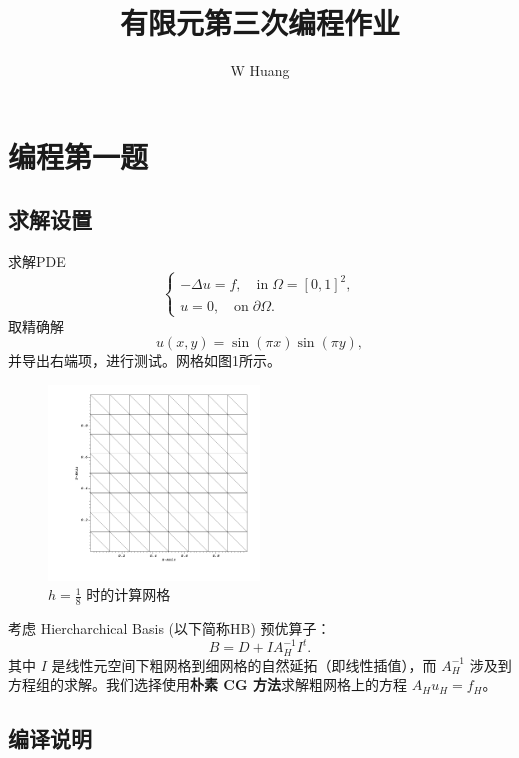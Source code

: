 \documentclass[lang=cn,11pt,a4paper]{elegantpaper}
\title{有限元第三次编程作业}
\author{W Huang}
\date{\zhtoday}
\begin{document}
\maketitle

\section{编程第一题}

\subsection{求解设置}

求解PDE
\begin{equation}
    \left\{
        \begin{array}{l}
            -\Delta u = f,\quad \text{in}\;\Omega=[0,1]^2,\\
            u = 0,\quad \text{on}\;\partial \Omega.
        \end{array}
    \right.
\end{equation}
取精确解
\begin{equation}
    u(x,y) = \sin(\pi x) \sin(\pi y),
\end{equation}
并导出右端项，进行测试。网格如图1所示。

\begin{figure}[H]
    \centering
    \includegraphics[width=0.5\textwidth]{png/mesh-2D.png}
    \caption{\small $h=\frac{1}{8}$ 时的计算网格}
\end{figure}

考虑 Hiercharchical Basis (以下简称HB) 预优算子：
\begin{equation}
    B=D+IA_H^{-1}I^t.
\end{equation}
其中 $I$ 是线性元空间下粗网格到细网格的自然延拓（即线性插值），而 $A_H^{-1}$ 涉及到
方程组的求解。我们选择使用\textbf{朴素 CG 方法}求解粗网格上的方程 $A_Hu_H=f_H$。

\subsection{编译说明}
\end{document}
